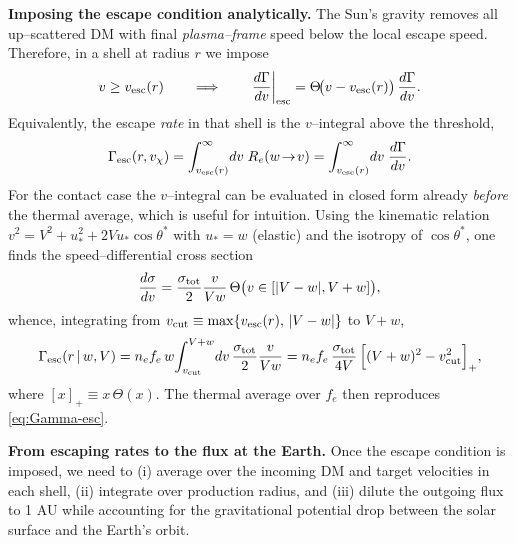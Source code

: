 \documentclass[13.1pt, letterpaper, twoside]{article}
\begin{document}
\medskip
\noindent\textbf{Imposing the escape condition analytically.}
The Sun’s gravity removes all up–scattered DM with final \emph{plasma–frame} speed below the local escape speed. Therefore, in a shell at radius $r$ we impose
\begin{equation}
    v\ge v_{\rm esc}(r)\qquad\Longrightarrow\qquad
    \left.\frac{d\Gamma}{dv}\right|_{\rm esc}
    =\Theta\!\big(v-v_{\rm esc}(r)\big)\,\frac{d\Gamma}{dv}.
\end{equation}
Equivalently, the escape \emph{rate} in that shell is the $v$–integral above the threshold,
\begin{equation}
    \label{eq:Gamma-esc}
    \Gamma_{\rm esc}(r,v_\chi)
    =\int_{v_{\rm esc}(r)}^\infty\!dv\;R_e(w\!\to\! v)
    =\int_{v_{\rm esc}(r)}^\infty\!dv\;\frac{d\Gamma}{dv}.
\end{equation}
For the contact case the $v$–integral can be evaluated in closed form already \emph{before} the thermal average, which is useful for intuition. Using the kinematic relation
\(
    v^2 = V^2 + u_\ast^2 + 2 V u_\ast\cos\theta^\ast
\)
with $u_\ast=w$ (elastic) and the isotropy of $\cos\theta^\ast$, one finds the speed–differential cross section
\[
    \frac{d\sigma}{dv}=\frac{\sigma_{\rm tot}}{2}\frac{v}{Vw}\,
    \Theta\big(v\in[|V-w|,V+w]\big),
\]
whence, integrating from $v_{\rm cut}\equiv\max\{v_{\rm esc}(r),\,|V-w|\}$ to $V+w$,
\begin{equation}
    \label{eq:Gammaesc-closed}
    \Gamma_{\rm esc}(r\,|\,w,V)
    = n_e f_e\, w\!\int_{v_{\rm cut}}^{V+w}\!dv\,\frac{\sigma_{\rm tot}}{2}\frac{v}{Vw}
    = n_e f_e\,\frac{\sigma_{\rm tot}}{4V}\,
    \Big[(V+w)^2-v_{\rm cut}^2\Big]_+,
\end{equation}
where $[x]_+\equiv x\,\Theta(x)$. The thermal average over $f_e$ then reproduces \eqref{eq:Gamma-esc}.

\medskip
\noindent\textbf{From escaping rates to the flux at the Earth.}
Once the escape condition is imposed, we need to (i) average over the incoming DM and target velocities in each shell, (ii) integrate over production radius, and (iii) dilute the outgoing flux to 1 AU while accounting for the gravitational potential drop between the solar surface and the Earth’s orbit.
\end{document}
